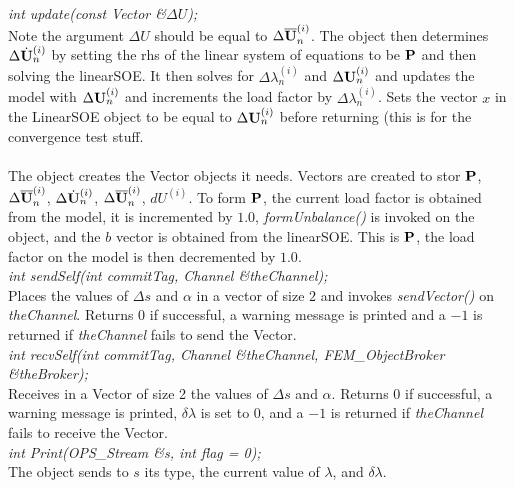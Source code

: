 {\em int update(const Vector \&$\Delta U$);} \\
Note the argument $\Delta U$ should be equal to $\Delta \Ub_n^{(i)}$.
The object then determines $\Delta \Uh_n^{(i)}$ by setting the rhs of
the linear system of equations to be $\P$ and then solving the
linearSOE. It then solves for
$\Delta \lambda_n^{(i)}$ and $\Delta \U_n^{(i)}$ and updates the model with
$\Delta \U_n^{(i)}$ and increments the load factor by $\Delta
\lambda_n^{(i)}$. Sets the vector $x$ in the LinearSOE object to be
equal to $\Delta \U_n^{(i)}$ before returning (this is for the
convergence test stuff. \\


\\ 
The object creates the Vector objects it needs. Vectors are created to
stor $\P$, $\Delta \Ub_n^{(i)}$, $\Delta \Uh_n^{(i)}$, $\Delta
\Ub_n^{(i)}$, $dU^{(i)}$. To form $\P$, the current load factor is
obtained from the model, it is incremented by $1.0$, {\em
formUnbalance()} is invoked on the object, and the $b$ vector is
obtained from the linearSOE. This is $\P$, the load factor on the
model is then decremented by $1.0$. \\

{\em int sendSelf(int commitTag, Channel \&theChannel); } \\ 
Places the values of $\Delta s$ and $\alpha$ in a
vector of size $2$ and invokes {\em sendVector()} on {\em theChannel}.
Returns $0$ if successful, a warning message is printed and
a $-1$ is returned if {\em theChannel} fails to send the Vector. \\

{\em int recvSelf(int commitTag, Channel \&theChannel, 
FEM\_ObjectBroker \&theBroker); } \\ 
Receives in a Vector of size 2 the values of $\Delta s$ and $\alpha$.
Returns $0$ if successful, a warning message is printed, $\delta
\lambda$ is set to $0$, and a $-1$ is returned if {\em theChannel}
fails to receive the Vector.\\

{\em int Print(OPS_Stream \&s, int flag = 0);}\\
The object sends to $s$ its type, the current value of $\lambda$, and
$\delta \lambda$. 